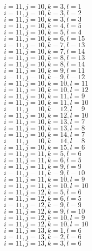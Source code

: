 \documentclass[14pt]{article}
\begin{document}
    $i=11,j=10,k=3,l=1 $ \\ 
    $i=11,j=10,k=3,l=2 $ \\ 
    $i=11,j=10,k=3,l=3 $ \\ 
    $i=11,j=10,k=4,l=5 $ \\ 
    $i=11,j=10,k=5,l=4 $ \\ 
    $i=11,j=10,k=6,l=15 $ \\ 
    $i=11,j=10,k=7,l=13 $ \\ 
    $i=11,j=10,k=7,l=14 $ \\ 
    $i=11,j=10,k=8,l=13 $ \\ 
    $i=11,j=10,k=8,l=14 $ \\ 
    $i=11,j=10,k=9,l=11 $ \\ 
    $i=11,j=10,k=9,l=12 $ \\ 
    $i=11,j=10,k=10,l=11 $ \\ 
    $i=11,j=10,k=10,l=12 $ \\ 
    $i=11,j=10,k=11,l=9 $ \\ 
    $i=11,j=10,k=11,l=10 $ \\ 
    $i=11,j=10,k=12,l=9 $ \\ 
    $i=11,j=10,k=12,l=10 $ \\ 
    $i=11,j=10,k=13,l=7 $ \\ 
    $i=11,j=10,k=13,l=8 $ \\ 
    $i=11,j=10,k=14,l=7 $ \\ 
    $i=11,j=10,k=14,l=8 $ \\ 
    $i=11,j=10,k=15,l=6 $ \\ 
    $i=11,j=11,k=5,l=6 $ \\ 
    $i=11,j=11,k=6,l=5 $ \\ 
    $i=11,j=11,k=9,l=9 $ \\ 
    $i=11,j=11,k=9,l=10 $ \\ 
    $i=11,j=11,k=10,l=9 $ \\ 
    $i=11,j=11,k=10,l=10 $ \\ 
    $i=11,j=12,k=5,l=6 $ \\ 
    $i=11,j=12,k=6,l=5 $ \\ 
    $i=11,j=12,k=9,l=9 $ \\ 
    $i=11,j=12,k=9,l=10 $ \\ 
    $i=11,j=12,k=10,l=9 $ \\ 
    $i=11,j=12,k=10,l=10 $ \\ 
    $i=11,j=13,k=1,l=6 $ \\ 
    $i=11,j=13,k=2,l=6 $ \\ 
    $i=11,j=13,k=3,l=6 $ \\ 
\end{document}
